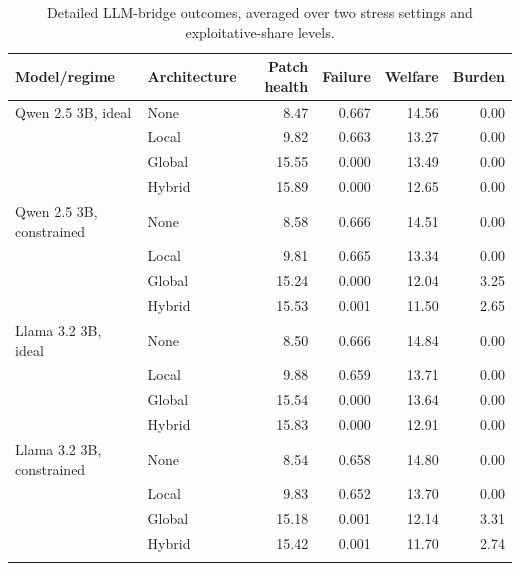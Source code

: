 \begin{table}[t]
    \centering
    \caption{Detailed LLM-bridge outcomes, averaged over two stress settings and exploitative-share levels.}
    \label{tab:llm-bridge-outcomes-detailed}
    \begin{tabular}{llrrrr}
        \toprule
        Model/regime & Architecture & Patch health & Failure & Welfare & Burden \\
        \midrule
        Qwen 2.5 3B, ideal & None & 8.47 & 0.667 & 14.56 & 0.00 \\
         & Local & 9.82 & 0.663 & 13.27 & 0.00 \\
         & Global & 15.55 & 0.000 & 13.49 & 0.00 \\
         & Hybrid & 15.89 & 0.000 & 12.65 & 0.00 \\
        \addlinespace
        Qwen 2.5 3B, constrained & None & 8.58 & 0.666 & 14.51 & 0.00 \\
         & Local & 9.81 & 0.665 & 13.34 & 0.00 \\
         & Global & 15.24 & 0.000 & 12.04 & 3.25 \\
         & Hybrid & 15.53 & 0.001 & 11.50 & 2.65 \\
        \addlinespace
        Llama 3.2 3B, ideal & None & 8.50 & 0.666 & 14.84 & 0.00 \\
         & Local & 9.88 & 0.659 & 13.71 & 0.00 \\
         & Global & 15.54 & 0.000 & 13.64 & 0.00 \\
         & Hybrid & 15.83 & 0.000 & 12.91 & 0.00 \\
        \addlinespace
        Llama 3.2 3B, constrained & None & 8.54 & 0.658 & 14.80 & 0.00 \\
         & Local & 9.83 & 0.652 & 13.70 & 0.00 \\
         & Global & 15.18 & 0.001 & 12.14 & 3.31 \\
         & Hybrid & 15.42 & 0.001 & 11.70 & 2.74 \\
        \addlinespace
        \bottomrule
    \end{tabular}
\end{table}
